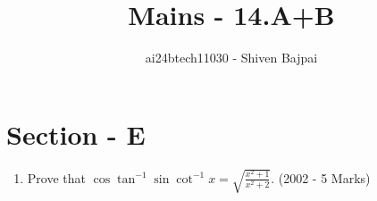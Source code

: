\documentclass[journal,12pt,twocolumn]{IEEEtran}
\theoremstyle{remark}
\begin{document}

\vspace{3cm}

\title{Mains - 14.A+B}
\author{ai24btech11030 - Shiven Bajpai}
\maketitle
\newpage
\bigskip

\renewcommand{\thefigure}{\theenumi}
\renewcommand{\thetable}{\theenumi}

\section*{Section - E}
\begin{enumerate}
	\item{
			Prove that $\cos \tan^{-1} \sin \cot^{-1} x = \sqrt{\frac{x^2 + 1}{x^2 + 2}}$. \hfill (2002 - 5 Marks)
		}
\end{enumerate}

\onecolumn
\end{document}
